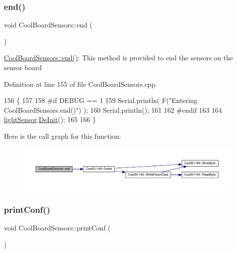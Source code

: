 \subsubsection{\texorpdfstring{end()}{end()}}
{\footnotesize\ttfamily void Cool\+Board\+Sensors\+::end (\begin{DoxyParamCaption}{ }\end{DoxyParamCaption})}

\hyperlink{class_cool_board_sensors_a4902b69f6e628bd6557193758fdd2bae}{Cool\+Board\+Sensors\+::end()}\+: This method is provided to end the sensors on the sensor board 

Definition at line 155 of file Cool\+Board\+Sensors.\+cpp.


\begin{DoxyCode}
156 \{
157 
158 \textcolor{preprocessor}{#if DEBUG == 1  }
159     Serial.println( F(\textcolor{stringliteral}{"Entering CoolBoardSensors.end()"}) );
160     Serial.println();
161 
162 \textcolor{preprocessor}{#endif}
163 
164     \hyperlink{class_cool_board_sensors_ac711c27d0927eb5e73be77f092c48be0}{lightSensor}.\hyperlink{class_cool_s_i114_x_a6840abd53a2e3d71a6bb918077c6d6e6}{DeInit}();
165 
166 \}
\end{DoxyCode}
Here is the call graph for this function\+:\nopagebreak
\begin{figure}[H]
\begin{center}
\leavevmode
\includegraphics[width=350pt]{de/d46/class_cool_board_sensors_a4902b69f6e628bd6557193758fdd2bae_cgraph}
\end{center}
\end{figure}
\mbox{\label{class_cool_board_sensors_af6fd79505815b204c178617ecf54c873}} 
\subsubsection{\texorpdfstring{print\+Conf()}{printConf()}}
{\footnotesize\ttfamily void Cool\+Board\+Sensors\+::print\+Conf (\begin{DoxyParamCaption}{ }\end{DoxyParamCaption})}

